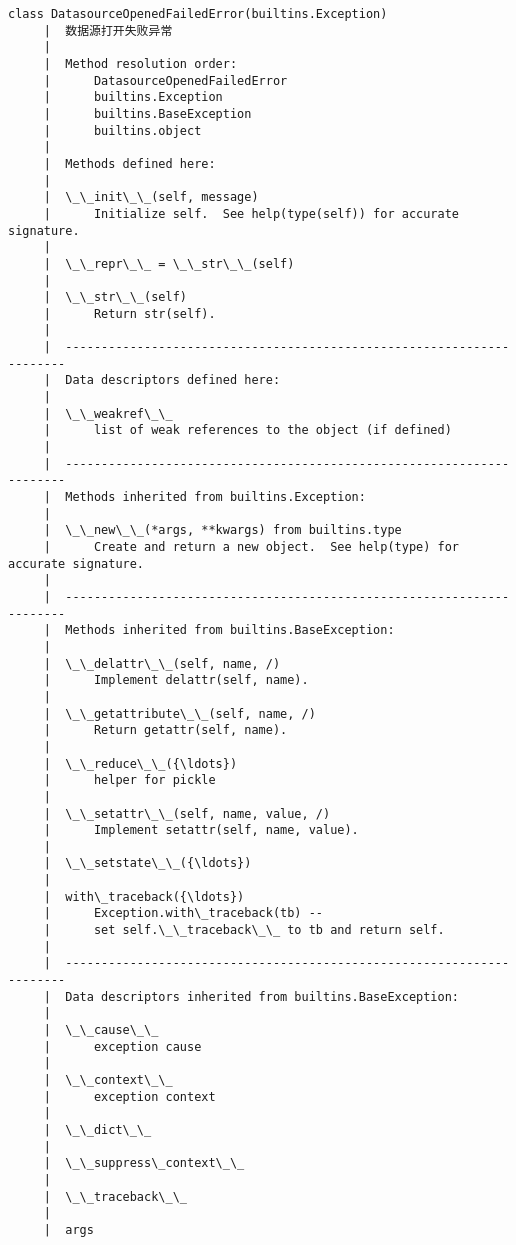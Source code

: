\documentclass[11pt]{article}
\begin{document}
\begin{Verbatim}[commandchars=\\\{\}]
    class DatasourceOpenedFailedError(builtins.Exception)
     |  数据源打开失败异常
     |  
     |  Method resolution order:
     |      DatasourceOpenedFailedError
     |      builtins.Exception
     |      builtins.BaseException
     |      builtins.object
     |  
     |  Methods defined here:
     |  
     |  \_\_init\_\_(self, message)
     |      Initialize self.  See help(type(self)) for accurate signature.
     |  
     |  \_\_repr\_\_ = \_\_str\_\_(self)
     |  
     |  \_\_str\_\_(self)
     |      Return str(self).
     |  
     |  ----------------------------------------------------------------------
     |  Data descriptors defined here:
     |  
     |  \_\_weakref\_\_
     |      list of weak references to the object (if defined)
     |  
     |  ----------------------------------------------------------------------
     |  Methods inherited from builtins.Exception:
     |  
     |  \_\_new\_\_(*args, **kwargs) from builtins.type
     |      Create and return a new object.  See help(type) for accurate signature.
     |  
     |  ----------------------------------------------------------------------
     |  Methods inherited from builtins.BaseException:
     |  
     |  \_\_delattr\_\_(self, name, /)
     |      Implement delattr(self, name).
     |  
     |  \_\_getattribute\_\_(self, name, /)
     |      Return getattr(self, name).
     |  
     |  \_\_reduce\_\_({\ldots})
     |      helper for pickle
     |  
     |  \_\_setattr\_\_(self, name, value, /)
     |      Implement setattr(self, name, value).
     |  
     |  \_\_setstate\_\_({\ldots})
     |  
     |  with\_traceback({\ldots})
     |      Exception.with\_traceback(tb) --
     |      set self.\_\_traceback\_\_ to tb and return self.
     |  
     |  ----------------------------------------------------------------------
     |  Data descriptors inherited from builtins.BaseException:
     |  
     |  \_\_cause\_\_
     |      exception cause
     |  
     |  \_\_context\_\_
     |      exception context
     |  
     |  \_\_dict\_\_
     |  
     |  \_\_suppress\_context\_\_
     |  
     |  \_\_traceback\_\_
     |  
     |  args
    

\end{Verbatim}
\end{document}
